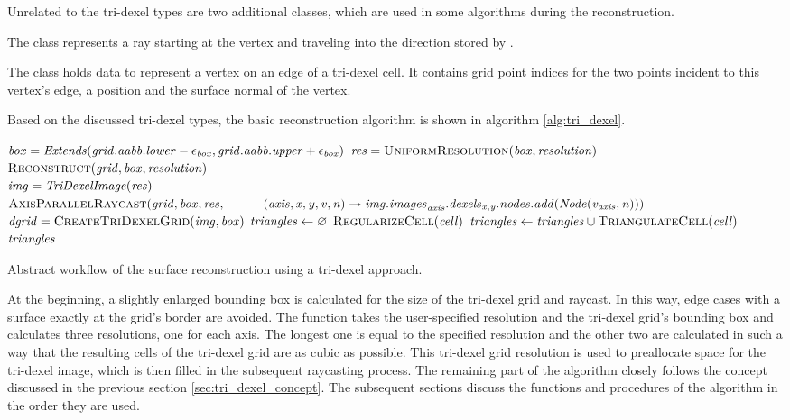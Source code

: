 Unrelated to the tri-dexel types are two additional classes, which are used in some algorithms during the reconstruction.

The  class represents a ray starting at the vertex  and traveling into the direction stored by .

The  class holds data to represent a vertex on an edge of a tri-dexel cell.
It contains grid point indices for the two points incident to this vertex's edge, a position and the surface normal of the vertex.

Based on the discussed tri-dexel types, the basic reconstruction algorithm is shown in algorithm \ref{alg:tri_dexel}.
%
\begin{algorithm}
	\centering
	\begin{algorithmic}[1]
			\State $\mathit{box} = \mathit{Extends}(\mathit{grid}.\mathit{aabb}.\mathit{lower} - \epsilon_{\mathit{box}}, \mathit{grid}.\mathit{aabb}.\mathit{upper} + \epsilon_{\mathit{box}})$
			\State $\var{res} = \Call{UniformResolution}{\var{box}, \var{resolution}}$
			\State $\Call{Reconstruct}{\var{grid}, \var{box}, \var{resolution}}$
		\EndFunction
		\\
			\State $\mathit{img} = \mathit{TriDexelImage}(\mathit{res})$ \label{alg:line:tri_dexel_begin}
			\State $\Call{AxisParallelRaycast}{\var{grid}, \var{box}, \var{res},\hfill\break
				\hspace*{\dimexpr\algorithmicindent*2}(\var{axis}, \var{x}, \var{y}, \var{v}, \var{n}) \rightarrow \var{img}.\var{images}_{\var{axis}}.\var{dexels}_{\var{x}, \var{y}}.\var{nodes}.\var{add}(\var{Node}(\var{v}_{\var{axis}}, \var{n}))}$
			\State $\var{dgrid} = \Call{CreateTriDexelGrid}{\var{img}, \var{box}}$
			\State $\mathit{triangles} \gets \varnothing$
				\State $\Call{RegularizeCell}{\var{cell}}$
				\State $\var{triangles} \gets \var{triangles} \cup \Call{TriangulateCell}{\var{cell}}$
			\EndFor
			\State \Return $\mathit{triangles}$
		\EndFunction
	\end{algorithmic}
	\caption{
		Abstract workflow of the surface reconstruction using a tri-dexel approach.
	}
	\label{alg:tri_dexel}
\end{algorithm}
%
At the beginning, a slightly enlarged bounding box is calculated for the size of the tri-dexel grid and raycast.
In this way, edge cases with a surface exactly at the grid's border are avoided.
The  function takes the user-specified resolution and the tri-dexel grid's bounding box and calculates three resolutions, one for each axis.
The longest one is equal to the specified resolution and the other two are calculated in such a way that the resulting cells of the tri-dexel grid are as cubic as possible.
This tri-dexel grid resolution is used to preallocate space for the tri-dexel image, which is then filled in the subsequent raycasting process.
The remaining part of the algorithm closely follows the concept discussed in the previous section \ref{sec:tri_dexel_concept}.
The subsequent sections discuss the functions and procedures of the algorithm in the order they are used.


